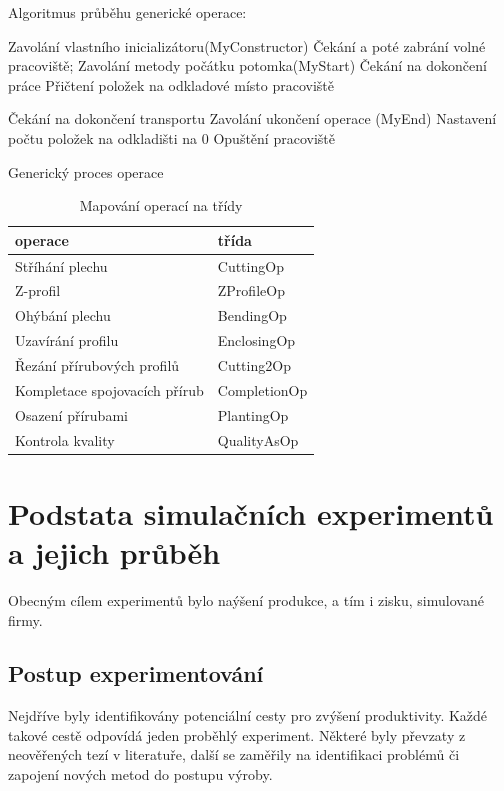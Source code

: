 \documentclass[11pt, a4paper]{article}
\begin{document}
Algoritmus průběhu generické operace:
\begin{algorithm}[ht]
        Zavolání vlastního inicializátoru(MyConstructor)\;
        Čekání a poté zabrání  volné pracoviště;\;
        Zavolání metody počátku potomka(MyStart)\;
        Čekání na dokončení práce\;
        Přičtení položek na odkladové místo pracoviště\;
		
		{
			Čekání na dokončení transportu\;
			{
			    Zavolání ukončení operace (MyEnd)\;
			}
			Nastavení počtu položek na odkladišti na 0\;
		}{}
		Opuštění pracoviště\;
	

		\caption{Generický proces operace}
		\label{algorithm:workshift}
	\end{algorithm}
\begin{table}[H]
    \centering
    \begin{tabular}{|l|l|}
     \hline \textbf{operace} &  \textbf{třída}\\ \hline
Stříhání plechu   & CuttingOp\\ \hline
Z-profil    &  ZProfileOp\\ \hline
Ohýbání plechu    & BendingOp\\ \hline
Uzavírání profilu    & EnclosingOp\\  \hline
Řezání přírubových profilů    & Cutting2Op\\ \hline
Kompletace spojovacích přírub& CompletionOp\\ \hline
Osazení přírubami    & PlantingOp \\
    \hline
Kontrola kvality    &QualityAsOp \\
    \hline


    \end{tabular}
    \caption{Mapování operací na třídy}
    \label{rgrg}
\end{table}


\section{Podstata simulačních experimentů a jejich průběh}
Obecným cílem experimentů bylo naýšení produkce, a tím i zisku, simulované firmy.

\subsection{Postup experimentování}
Nejdříve byly identifikovány potenciální cesty pro zvýšení produktivity. Každé takové cestě odpovídá jeden proběhlý experiment. Některé byly převzaty z neověřených tezí v literatuře, další se zaměřily na identifikaci problémů či zapojení nových metod do postupu výroby.
\end{document}
